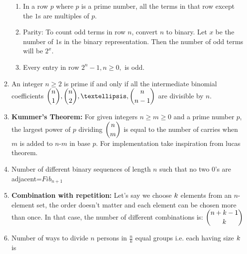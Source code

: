 \begin{enumerate}
\begin{enumerate}
                    \item In a row $\displaystyle p$ where $\displaystyle p$ is a prime number, all the terms in that row
                        except
                        the $\displaystyle 1$s are multiples of $\displaystyle p$.
                    \item Parity: To count odd terms in row $n$, convert $n$ to binary. Let $\displaystyle x$ be the
                        number of
                        $\displaystyle 1$s in the binary representation. Then the number of odd terms will be
                        $\displaystyle
                        2^x$.
                    \item Every entry in row $\displaystyle 2^n-1, n\geq 0,$ is odd.
                \end{enumerate}

            
            \item An integer $n\geq 2$ is prime if and only if all the intermediate binomial coefficients $\displaystyle
                \displaystyle {n \choose 1},{n \choose 2},…, {n \choose n-1}$ are divisible by $n$.
            \item \textbf{Kummer’s Theorem:} For given integers $n\geq m\geq 0$ and a prime number $\displaystyle
                p$,
                the
                largest power of $\displaystyle p$ dividing $\displaystyle \displaystyle {n \choose m}$ is equal to the
                number
                of carries when $m$ is added to $n$-$m$ in base $\displaystyle p$. For implementation take inspiration
                from
                lucas theorem.
            \item Number of different binary sequences of length $n$ such that no two $0$’s are adjacent=$\displaystyle
                Fib_{n+1}$
            
            \item \textbf{Combination with repetition:} Let’s say we choose $\displaystyle \displaystyle k$
                elements
                from
                an $n$-element set, the order doesn’t matter and each element can be chosen more than once. In that
                case,
                the
                number of different combinations is: $\displaystyle \displaystyle {n+k-1 \choose k}$
            \item 
                Number of ways to divide $n$ persons in $\displaystyle \frac{n}{k}$ equal groups i.e. each having
                    size
                    $\displaystyle \displaystyle k$ is


\end{enumerate}
